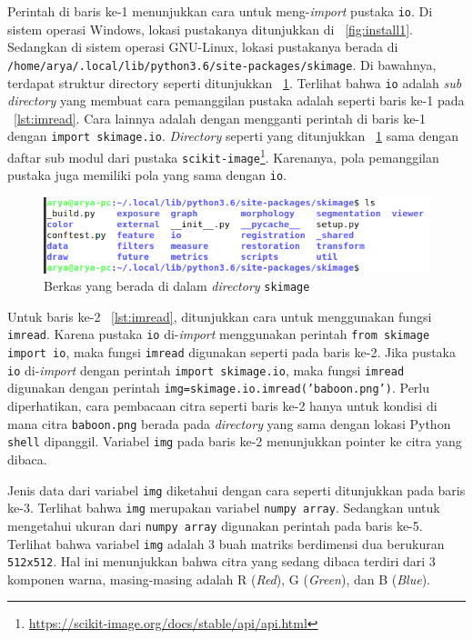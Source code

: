 Perintah di baris ke-1 menunjukkan cara untuk meng-\textit{import} pustaka \texttt{io}. Di sistem operasi Windows\textregistered, lokasi pustakanya ditunjukkan di \figurename~\ref{fig:install1}. Sedangkan di sistem operasi GNU-Linux, lokasi pustakanya berada di \texttt{/home/arya/.local/lib/python3.6/site-packages/skimage}. Di bawahnya, terdapat struktur directory seperti ditunjukkan \figurename~\ref{fig:libLocation}. Terlihat bahwa \texttt{io} adalah \textit{sub directory} yang membuat cara pemanggilan pustaka adalah seperti baris ke-1 pada \lstlistingname~\ref{lst:imread}. Cara lainnya adalah dengan mengganti perintah di baris ke-1 dengan \texttt{import skimage.io}. \textit{Directory} seperti yang ditunjukkan \figurename~\ref{fig:libLocation} sama dengan daftar sub modul dari pustaka \texttt{scikit-image}\footnote{\url{https://scikit-image.org/docs/stable/api/api.html}}. Karenanya, pola pemanggilan pustaka juga memiliki pola yang sama dengan \texttt{io}.

\begin{figure}[h!]
  \begin{center}
    \includegraphics[scale=.65]{pics/libLocation.png}
    \caption{Berkas yang berada di dalam \textit{directory} \texttt{skimage}}
    \label{fig:libLocation}
  \end{center}
\end{figure}

Untuk baris ke-2 \lstlistingname~\ref{lst:imread}, ditunjukkan cara untuk menggunakan fungsi \texttt{imread}. Karena pustaka \texttt{io} di-\textit{import} menggunakan perintah \texttt{from skimage import io}, maka fungsi \texttt{imread} digunakan seperti pada baris ke-2. Jika pustaka \texttt{io} di-\textit{import} dengan perintah \texttt{import skimage.io}, maka fungsi \texttt{imread} digunakan dengan perintah \texttt{img=skimage.io.imread('baboon.png')}. Perlu diperhatikan, cara pembacaan citra seperti baris ke-2 hanya untuk kondisi di mana citra \texttt{baboon.png} berada pada \textit{directory} yang sama dengan lokasi Python \texttt{shell} dipanggil. Variabel \texttt{img} pada baris ke-2 menunjukkan pointer ke citra yang dibaca.

Jenis data dari variabel \texttt{img} diketahui dengan cara seperti ditunjukkan pada baris ke-3. Terlihat bahwa \texttt{img} merupakan variabel \texttt{numpy array}. Sedangkan untuk mengetahui ukuran dari \texttt{numpy array} digunakan perintah pada baris ke-5. Terlihat bahwa variabel \texttt{img} adalah 3 buah matriks berdimensi dua berukuran \texttt{512x512}. Hal ini menunjukkan bahwa citra yang sedang dibaca terdiri dari 3 komponen warna, masing-masing adalah R (\textit{Red}), G (\textit{Green}), dan B (\textit{Blue}). 

